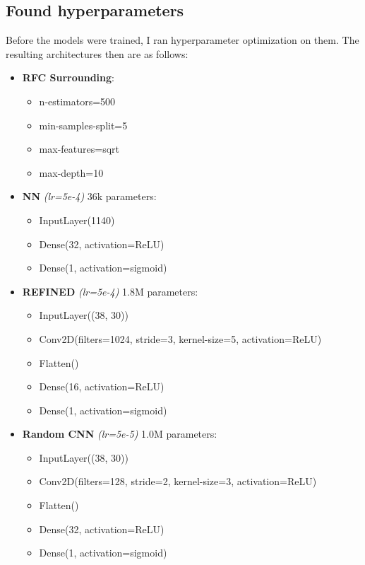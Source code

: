 \subsection{Found hyperparameters}

Before the models were trained, I ran hyperparameter optimization on them. The resulting architectures then are as follows:
\begin{itemize}
    \item \textbf{RFC Surrounding}:
    \begin{itemize}
        \item n-estimators=500
        \item min-samples-split=5
        \item max-features=sqrt
        \item max-depth=10
    \end{itemize}
    \item \textbf{NN} \textit{(lr=5e-4)} 36k parameters:
    \begin{itemize}
        \item InputLayer(1140)
        \item Dense(32, activation=ReLU)
        \item Dense(1, activation=sigmoid)
    \end{itemize}
    \item \textbf{REFINED} \textit{(lr=5e-4)} 1.8M parameters:
    \begin{itemize}
        \item InputLayer((38, 30))
        \item Conv2D(filters=1024, stride=3, kernel-size=5, activation=ReLU)
        \item Flatten()
        \item Dense(16, activation=ReLU)
        \item Dense(1, activation=sigmoid)
    \end{itemize}
    \item \textbf{Random CNN} \textit{(lr=5e-5)} 1.0M parameters:
    \begin{itemize}
        \item InputLayer((38, 30))
        \item Conv2D(filters=128, stride=2, kernel-size=3, activation=ReLU)
        \item Flatten()
        \item Dense(32, activation=ReLU)
        \item Dense(1, activation=sigmoid)
    \end{itemize}

\end{itemize}
